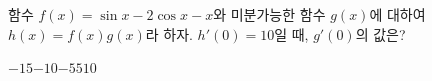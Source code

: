 함수 $f(x)=\sin x-2\cos x-x$와 미분가능한 함수 $g(x)$에 대하여 $h(x)=f(x)g(x)$라 하자. $h'(0)=10$일 때, $g'(0)$의 값은?
\begin{choices32}{$-15$}{$-10$}{$-5$}{$5$}{$10$}\end{choices32}
